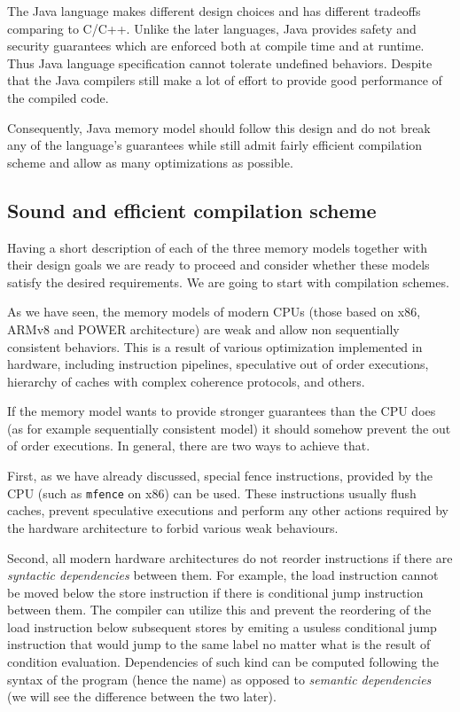 \documentclass[a4paper,twoside,11pt]{article}
\numberwithin{equation}{section}
\begin{document}
The Java language makes different design choices and has different tradeoffs comparing to C/C++.
Unlike the later languages, Java provides safety and security guarantees
which are enforced both at compile time and at runtime.  
Thus Java language specification cannot tolerate undefined behaviors.
Despite that the Java compilers still make a lot of effort 
to provide good performance of the compiled code.

Consequently, Java memory model should follow this design 
and do not break any of the language's guarantees
while still admit fairly efficient compilation scheme
and allow as many optimizations as possible.

\subsection{Sound and efficient compilation scheme}

Having a short description of each of the three memory models 
together with their design goals we are ready to proceed 
and consider whether these models satisfy the desired requirements.
We are going to start with compilation schemes.

As we have seen, the memory models of modern CPUs 
(those based on x86, ARMv8 and POWER architecture)
are weak and allow non sequentially consistent behaviors.
This is a result of various optimization implemented in hardware,
including instruction pipelines, speculative out of order executions, 
hierarchy of caches with complex coherence protocols, and others.

If the memory model wants to provide stronger guarantees 
than the CPU does (as for example sequentially consistent model)
it should somehow prevent the out of order executions.
In general, there are two ways to achieve that. 

First, as we have already discussed, special fence instructions,
provided by the CPU (such as \texttt{mfence} on x86) can be used.
These instructions usually flush caches, prevent speculative executions
and perform any other actions required by the hardware architecture
to forbid various weak behaviours.

Second, all modern hardware architectures do not reorder instructions 
if there are \emph{syntactic dependencies} between them. 
For example, the load instruction cannot be moved below 
the store instruction if there is conditional jump instruction between them.
The compiler can utilize this and prevent 
the reordering of the load instruction below subsequent stores
by emiting a usuless conditional jump instruction that would jump 
to the same label no matter what is the result of condition evaluation.
Dependencies of such kind can be computed following the 
syntax of the program (hence the name) as opposed 
to \emph{semantic dependencies} 
(we will see the difference between the two later).
\end{document}
